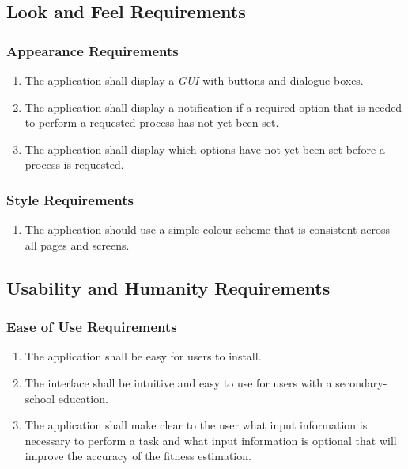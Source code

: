 \documentclass[12pt,letterpaper]{article}
\begin{document}
\subsection{Look and Feel Requirements}
\label{sub:look_and_feel_requirements}

\subsubsection{Appearance Requirements}
\label{ssub:appearance_requirements}
\begin{enumerate}[{LF-A}1. ]
	\item The application shall display a \textit{GUI} with buttons and dialogue boxes.
	
	\item The application shall display a notification if a required option that is needed to perform a requested process has not yet been set.
	
	\item The application shall display which options have not yet been set before a process is requested.
\end{enumerate}

\subsubsection{Style Requirements}
\label{ssub:style_requirements}
\begin{enumerate}[{LF-S}1. ]
	\item The application should use a simple colour scheme that is consistent across all pages and screens.
\end{enumerate}


\subsection{Usability and Humanity Requirements}
\label{sub:usability_and_humanity_requirements}

\subsubsection{Ease of Use Requirements}
\label{ssub:ease_of_use_requirements}
\begin{enumerate}[{UH-EU}1. ]
	\item The application shall be easy for users to install.
	
	\item The interface shall be intuitive and easy to use for users with a secondary-school education.
	
	\item The application shall make clear to the user what input information is necessary to perform a task and what input information is optional that will improve the accuracy of the fitness estimation.
	
\end{enumerate}
\end{document}
